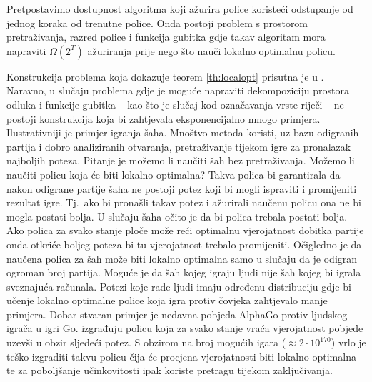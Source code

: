 \begin{theorem} \label{th:localopt}

  Pretpostavimo dostupnost algoritma koji ažurira police koristeći odstupanje od
  jednog koraka od trenutne police. Onda postoji problem s prostorom
  pretraživanja, razred police i funkcija gubitka gdje takav algoritam mora
  napraviti $\Omega(2^T)$ ažuriranja prije nego što nauči lokalno optimalnu
  policu.

\end{theorem}

Konstrukcija problema koja dokazuje teorem \ref{th:localopt} prisutna je u
\citep{daume15lols}. Naravno, u slučaju problema gdje je moguće napraviti
dekompoziciju prostora odluka i funkcije gubitka -- kao što je slučaj kod
označavanja vrste riječi -- ne postoji konstrukcija koja bi zahtjevala
eksponencijalno mnogo primjera. Ilustrativniji je primjer igranja šaha. Mnoštvo
metoda koristi, uz bazu odigranih partija i dobro analiziranih otvaranja,
pretraživanje tijekom igre za pronalazak najboljih poteza. Pitanje je možemo li
naučiti šah bez pretraživanja. Možemo li naučiti policu koja će biti lokalno
optimalna? Takva polica bi garantirala da nakon odigrane partije šaha ne postoji
potez koji bi mogli ispraviti i promijeniti rezultat igre. Tj.~ako bi pronašli
takav potez i ažurirali naučenu policu ona ne bi mogla postati bolja. U slučaju
šaha očito je da bi polica trebala postati bolja. Ako polica za svako stanje
ploče može reći optimalnu vjerojatnost dobitka partije onda otkriće boljeg
poteza bi tu vjerojatnost trebalo promijeniti. Očigledno je da naučena polica za
šah može biti lokalno optimalna samo u slučaju da je odigran ogroman broj
partija. Moguće je da šah kojeg igraju ljudi nije šah kojeg bi igrala sveznajuća
računala. Potezi koje rade ljudi imaju određenu distribuciju gdje bi učenje
lokalno optimalne police koja igra protiv čovjeka zahtjevalo manje primjera.
Dobar stvaran primjer je nedavna pobjeda AlphaGo protiv ljudskog igrača u igri
Go. \citet{silver2016mastering} izgrađuju policu koja za svako stanje vraća
vjerojatnost pobjede uzevši u obzir sljedeći potez. S obzirom na broj mogućih
igara ($\approx 2\cdot10^{170}$) vrlo je teško izgraditi takvu policu čija će
procjena vjerojatnosti biti lokalno optimalna te za poboljšanje učinkovitosti
ipak koriste pretragu tijekom zaključivanja.
